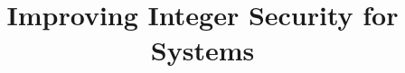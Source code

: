 \documentclass{article}
\begin{document}
\title{Improving Integer Security for Systems}
\author{}
\date{}
\maketitle














\end{document}
